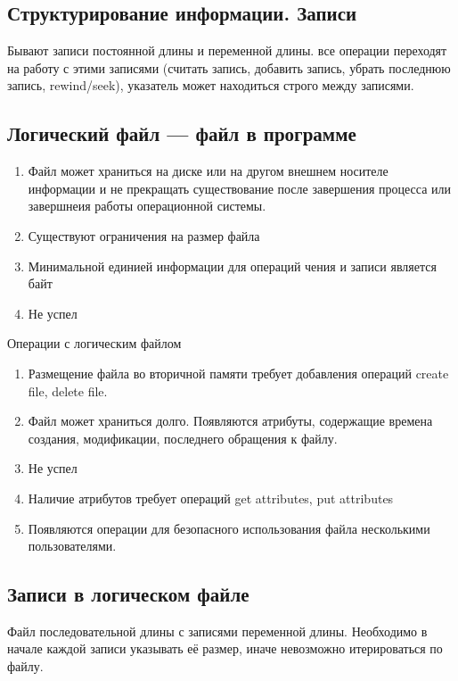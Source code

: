 \documentclass[12pt, a4paper]{article}
\begin{document}
    \subsection{Структурирование информации. Записи}
    Бывают записи постоянной длины и переменной длины. все операции переходят на работу с этими записями (считать запись, добавить запись, убрать последнюю запись, rewind/seek), указатель может находиться строго между записями.
    \subsection{Логический файл --- файл в программе}
    \begin{enumerate}
        \item Файл может храниться на диске или на другом внешнем носителе информации и не прекращать существование после завершения процесса или завершнеия работы операционной системы.
        \item Существуют ограничения на размер файла
        \item Минимальной единией информации для операций чения и записи является байт
        \item Не успел
    \end{enumerate}
    \begin{center}
        Операции с логическим файлом
    \end{center}
    \begin{enumerate}
        \item Размещение файла во вторичной памяти требует добавления операций create file, delete file.
        \item Файл может храниться долго. Появляются атрибуты, содержащие времена создания, модификации, последнего обращения к файлу.
        \item Не успел
        \item Наличие атрибутов требует операций get attributes, put attributes
        \item Появляются операции для безопасного использования файла несколькими пользователями.
    \end{enumerate}
    \subsection{Записи в логическом файле}
    Файл последовательной длины с записями переменной длины. Необходимо в начале каждой записи указывать её размер, иначе невозможно итерироваться по файлу.
\end{document}
